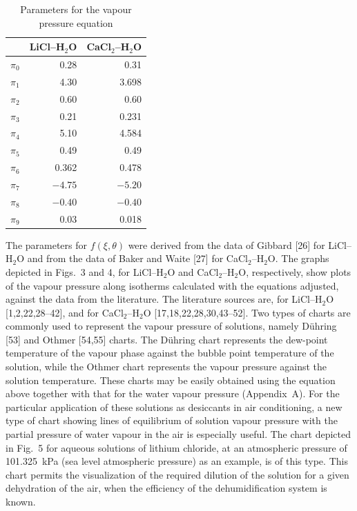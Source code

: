 \documentclass[11pt]{article}
\begin{document}
\begin{table}[htbp]
\centering
\caption{Parameters for the vapour pressure equation}
\begin{tabular}{lrr}
\toprule
 & LiCl--H$_2$O & CaCl$_2$--H$_2$O \\
\midrule
$\pi_0$ & 0.28 & 0.31 \\
$\pi_1$ & 4.30 & 3.698 \\
$\pi_2$ & 0.60 & 0.60 \\
$\pi_3$ & 0.21 & 0.231 \\
$\pi_4$ & 5.10 & 4.584 \\
$\pi_5$ & 0.49 & 0.49 \\
$\pi_6$ & 0.362 & 0.478 \\
$\pi_7$ & $-4.75$ & $-5.20$ \\
$\pi_8$ & $-0.40$ & $-0.40$ \\
$\pi_9$ & 0.03 & 0.018 \\
\bottomrule
\end{tabular}
\end{table}

The parameters for $f(\xi,\theta)$ were derived from the data of Gibbard [26] for
LiCl--H$_2$O and from the data of Baker and Waite [27] for CaCl$_2$--H$_2$O. The graphs
depicted in Figs.~3 and 4, for LiCl--H$_2$O and CaCl$_2$--H$_2$O, respectively, show plots
of the vapour pressure along isotherms calculated with the equations adjusted, against the
data from the literature. The literature sources are, for LiCl--H$_2$O
[1,2,22,28--42], and for CaCl$_2$--H$_2$O [17,18,22,28,30,43--52]. Two types of charts are
commonly used to represent the vapour pressure of solutions, namely D\"uhring [53] and
Othmer [54,55] charts. The D\"uhring chart represents the dew-point temperature of the
vapour phase against the bubble point temperature of the solution, while the Othmer chart
represents the vapour pressure against the solution temperature. These charts may be
easily obtained using the equation above together with that for the water vapour pressure
(Appendix~A). For the particular application of these solutions as desiccants in air
conditioning, a new type of chart showing lines of equilibrium of solution vapour pressure
with the partial pressure of water vapour in the air is especially useful. The chart
depicted in Fig.~5 for aqueous solutions of lithium chloride, at an atmospheric pressure of
101.325~kPa (sea level atmospheric pressure) as an example, is of this type. This chart
permits the visualization of the required dilution of the solution for a given dehydration
of the air, when the efficiency of the dehumidification system is known.
\end{document}
